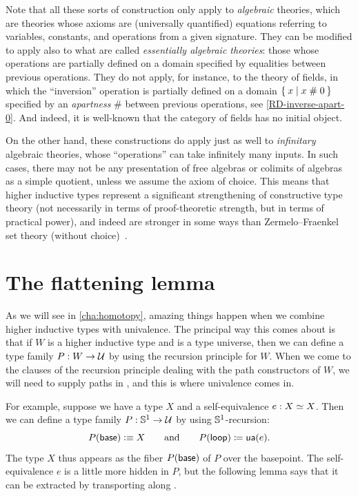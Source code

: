 \mentalpause

Note that all these sorts of construction only apply to \emph{algebraic} theories, which are theories whose axioms are (universally quantified) equations referring to variables, constants, and operations from a given signature.
They can be modified to apply also to what are called \emph{essentially algebraic theories}: those whose operations are partially defined on a domain specified by equalities between previous operations.
They do not apply, for instance, to the theory of fields, in which the ``inversion'' operation is partially defined on a domain $\Set{x | x \mathrel{\#} 0}$ specified by an \emph{apartness} $\#$ between previous operations, see \cref{RD-inverse-apart-0}.
And indeed, it is well-known that the category of fields has no initial object.
%

On the other hand, these constructions do apply just as well to \emph{infinitary} algebraic theories, whose ``operations'' can take infinitely many inputs.
In such cases, there may not be any presentation of free algebras or colimits of algebras as a simple quotient, unless we assume the axiom of choice.
This means that higher inductive types represent a significant strengthening of constructive type theory (not necessarily in terms of proof-theoretic strength, but in terms of practical power), and indeed are stronger in some ways than Zermelo--Fraenkel set theory (without choice)~\cite{blass:freealg}.


\section{The flattening lemma}
\label{sec:flattening}

As we will see in \cref{cha:homotopy}, amazing things happen when we combine higher inductive types with univalence.
The principal way this comes about is that if $W$ is a higher inductive type and \UU is a type universe, then we can define a type family $P:W\to \mathcal{U}$ by using the recursion principle for $W$.
When we come to the clauses of the recursion principle dealing with the path constructors of $W$, we will need to supply paths in \UU, and this is where univalence comes in.

For example, suppose we have a type $X$ and a self-equivalence $e:X \simeq X$.
Then we can define a type family $P:\mathbb{S}^1 \to \mathcal{U}$ by using $\mathbb{S}^1$-recursion:
\begin{equation*}
  P(\mathsf{base}) \vcentcolon\equiv X
  \qquad\text{and}\qquad
  {P}\mathopen{}\left({\mathsf{loop}}\right)\mathclose{} \coloneqq \mathsf{ua}(e).
\end{equation*}
The type $X$ thus appears as the fiber $P(\mathsf{base})$ of $P$ over the basepoint.
The self-equivalence $e$ is a little more hidden in $P$, but the following lemma says that it can be extracted by transporting along \lloop.

